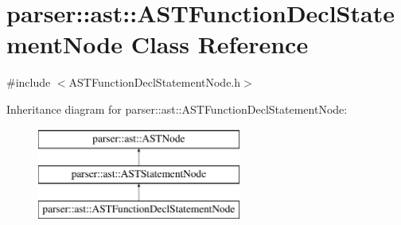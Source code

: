 \hypertarget{classparser_1_1ast_1_1ASTFunctionDeclStatementNode}{}\section{parser\+:\+:ast\+:\+:A\+S\+T\+Function\+Decl\+Statement\+Node Class Reference}
\label{classparser_1_1ast_1_1ASTFunctionDeclStatementNode}


{\ttfamily \#include $<$A\+S\+T\+Function\+Decl\+Statement\+Node.\+h$>$}

Inheritance diagram for parser\+:\+:ast\+:\+:A\+S\+T\+Function\+Decl\+Statement\+Node\+:\begin{figure}[H]
\begin{center}
\leavevmode
\includegraphics[height=3.000000cm]{d1/d41/classparser_1_1ast_1_1ASTFunctionDeclStatementNode}
\end{center}
\end{figure}
